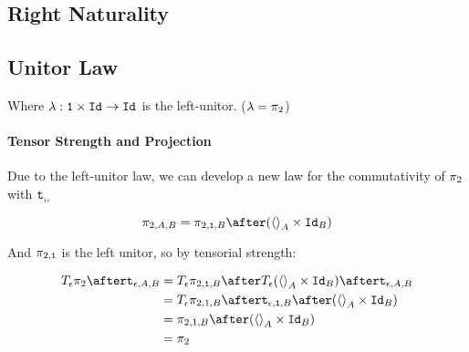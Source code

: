 {\subsection{Right Naturality}


\subsection{Unitor Law}
Where $\lambda: \texttt{\texttt{1}} \times \texttt{Id}_{} \rightarrow \texttt{Id}_{}$ is the left-unitor.
($\lambda = \pi_2$)

\paragraph{Tensor Strength and Projection}
Due to the left-unitor law, we can develop a new law for the commutativity of $\pi_2$ with $\texttt{t}_{, , }$

    $$\pi_{2, A, B} = \pi_{2, \1, B} \after (\term{A} \times \Id{B})$$

    And $\pi_{2, \texttt{1}}$ is the left unitor, so by tensorial strength:
    
    \begin{equation}
        \begin{split}
            \T{\e}{\pp} \after \tstrength{\e}{A}{B} & = \T{\e}{\pi_{2, \1, B}} \after \T{\e}{(\term{A} \times \Id{B})} \after \tstrength{\e}{A}{B} \\
            & = \T{\e}{\pi_{2, 1, B}} \after \tstrength{\e}{\1}{B} \after (\term{A} \times \Id{B}) \\
            & = \pi_{2,1,B} \after (\term{A} \times \Id{B}) \\
            & = \pp
        \end{split}
    \end{equation}

}
